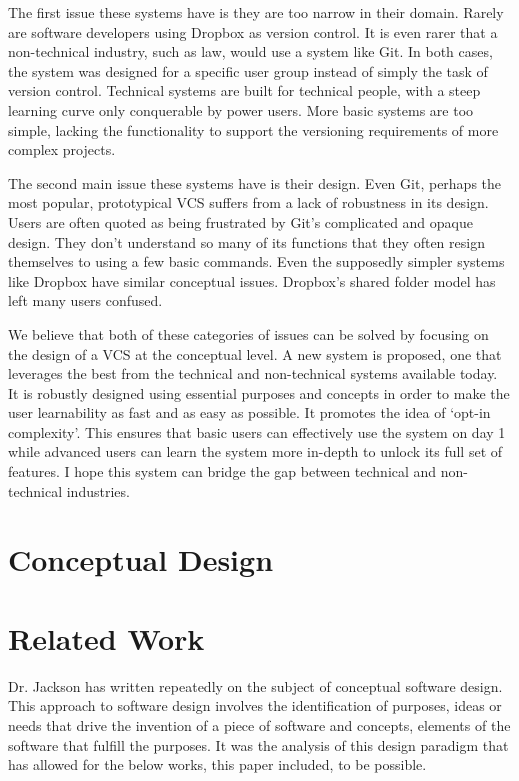 The first issue these systems have is they are too narrow in their domain. Rarely are software developers using Dropbox as version control. It is even rarer that a non-technical industry, such as law, would use a system like Git. In both cases, the system was designed for a specific user group instead of simply the task of version control. Technical systems are built for technical people, with a steep learning curve only conquerable by power users. More basic systems are too simple, lacking the functionality to support the versioning requirements of more complex projects.

The second main issue these systems have is their design. Even Git, perhaps the most popular, prototypical VCS suffers from a lack of robustness in its design. Users are often quoted as being frustrated by Git’s complicated and  opaque design. They don’t understand so many of its functions that they often resign themselves to using a few basic commands. Even the supposedly simpler systems like Dropbox have similar conceptual issues. Dropbox’s shared folder model has left many users confused. 

We believe that both of these categories of issues can be solved by focusing on the design of a VCS at the conceptual level. A new system is proposed, one that leverages the best from the technical and non-technical systems available today. It is robustly designed using essential purposes and concepts in order to make the user learnability as fast and as easy as possible. It promotes the idea of ‘opt-in complexity’. This ensures that basic users can effectively use the system on day 1 while advanced users can learn the system more in-depth to unlock its full set of features. I hope this system can bridge the gap between technical and non-technical industries. 

\section{Conceptual Design}



\section{Related Work}

Dr. Jackson has written repeatedly on the subject of conceptual software design. This approach to software design involves the identification of purposes, ideas or needs that drive the invention of a piece of software and concepts, elements of the software that fulfill the purposes. It was the analysis of this design paradigm that has allowed for the below works, this paper included, to be possible.

